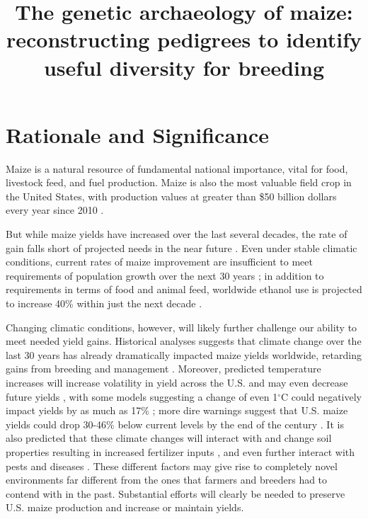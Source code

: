 \documentclass[12pt]{article}
\begin{document}
\title{\vspace{-5ex}The genetic archaeology of maize: reconstructing pedigrees to identify useful diversity for breeding\vspace{-4ex}}
\author{}
\date{}
\maketitle


\section*{Rationale and Significance}
\label{sec:rationale}

Maize is a natural resource of fundamental national importance, vital for food, livestock feed, and fuel production.
Maize is also the most valuable field crop in the United States, with production values at greater than \$50 billion dollars every year since 2010 \citep{Tho98w}. 

But while maize yields have increased over the last several decades, the rate of gain falls short of projected needs in the near future \citep{grassini2013distinguishing}.
Even under stable climatic conditions, current rates of maize improvement are insufficient to meet requirements of population growth over the next 30 years \citep{ray2013yield}; in  addition to requirements in terms of food and animal feed, worldwide ethanol use is projected to increase 40\% within just the next decade \citep{wtf2015usda}.

Changing climatic conditions, however, will likely further challenge our ability to meet needed yield gains. 
Historical analyses suggests that climate change over the last 30 years has already dramatically impacted maize yields worldwide, retarding gains from breeding and management \citep{Lobell2011}.
Moreover, predicted temperature increases will increase volatility in yield across the U.S. and may even decrease future yields \citep{urban2012projected}, with some models suggesting a change of even 1$^{\circ}$C could negatively impact yields by as much as 17\% \citep{lobell2003climate}; more dire warnings suggest that U.S. maize yields could drop 30-46\% below current levels by the end of the century \citep{schlenker2009nonlinear}.
It is also predicted that these climate changes will interact with and change soil properties resulting in increased fertilizer inputs \citep{rosenzweig2014assessing}, and even further interact with pests and diseases \citep{anderson2004emerging}. 
These different factors may give rise to completely novel environments far different from the ones that farmers and breeders had to contend with in the past. 
Substantial efforts will clearly be needed to preserve U.S. maize production and increase or maintain yields.  
\end{document}
